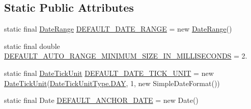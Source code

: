 \subsection*{Static Public Attributes}
\begin{DoxyCompactItemize}
\item 
static final \mbox{\hyperlink{classorg_1_1jfree_1_1data_1_1time_1_1_date_range}{Date\+Range}} \mbox{\hyperlink{classorg_1_1jfree_1_1chart_1_1axis_1_1_date_axis_a1958a5d9c7e3d86cd2b983029c41f0db}{D\+E\+F\+A\+U\+L\+T\+\_\+\+D\+A\+T\+E\+\_\+\+R\+A\+N\+GE}} = new \mbox{\hyperlink{classorg_1_1jfree_1_1data_1_1time_1_1_date_range}{Date\+Range}}()
\item 
static final double \mbox{\hyperlink{classorg_1_1jfree_1_1chart_1_1axis_1_1_date_axis_a32d96a47b298744f02059b890725cfe9}{D\+E\+F\+A\+U\+L\+T\+\_\+\+A\+U\+T\+O\+\_\+\+R\+A\+N\+G\+E\+\_\+\+M\+I\+N\+I\+M\+U\+M\+\_\+\+S\+I\+Z\+E\+\_\+\+I\+N\+\_\+\+M\+I\+L\+L\+I\+S\+E\+C\+O\+N\+DS}} = 2.
\item 
static final \mbox{\hyperlink{classorg_1_1jfree_1_1chart_1_1axis_1_1_date_tick_unit}{Date\+Tick\+Unit}} \mbox{\hyperlink{classorg_1_1jfree_1_1chart_1_1axis_1_1_date_axis_a5a192f3d8326fa7480a78571627b7809}{D\+E\+F\+A\+U\+L\+T\+\_\+\+D\+A\+T\+E\+\_\+\+T\+I\+C\+K\+\_\+\+U\+N\+IT}} = new \mbox{\hyperlink{classorg_1_1jfree_1_1chart_1_1axis_1_1_date_tick_unit}{Date\+Tick\+Unit}}(\mbox{\hyperlink{classorg_1_1jfree_1_1chart_1_1axis_1_1_date_tick_unit_type_a26b629f36cb016fb5efddebd100fb4a1}{Date\+Tick\+Unit\+Type.\+D\+AY}}, 1, new Simple\+Date\+Format())
\item 
static final Date \mbox{\hyperlink{classorg_1_1jfree_1_1chart_1_1axis_1_1_date_axis_afd68e160f2b30b495da4a4ed9dc4e94f}{D\+E\+F\+A\+U\+L\+T\+\_\+\+A\+N\+C\+H\+O\+R\+\_\+\+D\+A\+TE}} = new Date()
\end{DoxyCompactItemize}
